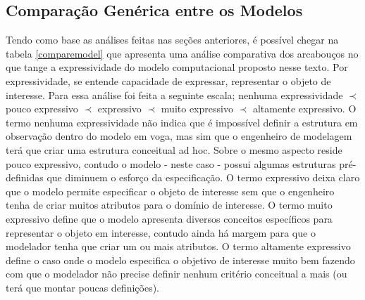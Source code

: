 \subsection{Comparação Genérica entre os Modelos}

Tendo como base as análises feitas nas seções anteriores, é possível chegar na tabela \ref{comparemodel} que apresenta uma análise comparativa dos arcabouços no que tange a expressividade do modelo computacional proposto nesse texto. Por expressividade, se entende capacidade de expressar, representar o objeto de interesse. Para essa análise 
foi feita a seguinte escala; nenhuma expressividade $\prec$ pouco expressivo $\prec$ expressivo $\prec$ muito expressivo $\prec$ altamente expressivo. O termo nenhuma expressividade não indica que é impossível definir a estrutura em observação dentro do modelo em voga, mas sim que o engenheiro de modelagem terá que criar uma estrutura conceitual ad hoc. Sobre o mesmo aspecto reside pouco expressivo, contudo o modelo - neste caso - possui algumas estruturas pré-definidas que diminuem o esforço da especificação. O termo expressivo deixa claro que o modelo permite especificar o objeto de interesse sem que o engenheiro tenha de criar muitos atributos para o domínio de interesse. O termo muito expressivo define que o modelo apresenta diversos conceitos específicos para representar o objeto em interesse, contudo ainda há margem para que o modelador tenha que criar um ou mais atributos. O termo altamente expressivo define o caso onde o modelo especifica o objetivo de interesse muito bem fazendo com que o modelador não precise definir nenhum critério conceitual a mais (ou terá que montar poucas definições).   

